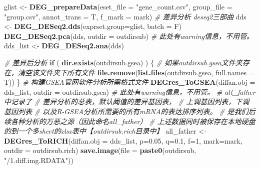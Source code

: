 \documentclass[
]{book}
\newenvironment{Shaded}{\begin{snugshade}}{\end{snugshade}}
\newcommand{\AttributeTok}[1]{\textcolor[rgb]{0.13,0.29,0.53}{#1}}
\newcommand{\CommentTok}[1]{\textcolor[rgb]{0.56,0.35,0.01}{\textit{#1}}}
\newcommand{\ControlFlowTok}[1]{\textcolor[rgb]{0.13,0.29,0.53}{\textbf{#1}}}
\newcommand{\DecValTok}[1]{\textcolor[rgb]{0.00,0.00,0.81}{#1}}
\newcommand{\FloatTok}[1]{\textcolor[rgb]{0.00,0.00,0.81}{#1}}
\newcommand{\FunctionTok}[1]{\textcolor[rgb]{0.13,0.29,0.53}{\textbf{#1}}}
\newcommand{\NormalTok}[1]{#1}
\newcommand{\OtherTok}[1]{\textcolor[rgb]{0.56,0.35,0.01}{#1}}
\newcommand{\StringTok}[1]{\textcolor[rgb]{0.31,0.60,0.02}{#1}}
\begin{document}
\begin{Shaded}
\begin{Highlighting}[]
\NormalTok{glist }\OtherTok{\textless{}{-}} \FunctionTok{DEG\_prepareData}\NormalTok{(}\AttributeTok{eset\_file =} \StringTok{"gene\_count.csv"}\NormalTok{,}
                         \AttributeTok{group\_file =} \StringTok{"group.csv"}\NormalTok{,}
                         \AttributeTok{annot\_trans =}\NormalTok{ T,}
                         \AttributeTok{f\_mark =}\NormalTok{ mark)}
\CommentTok{\# 差异分析 deseq2三部曲}
\NormalTok{dds }\OtherTok{\textless{}{-}} \FunctionTok{DEG\_DESeq2.dds}\NormalTok{(}\AttributeTok{exprset.group=}\NormalTok{glist, }\AttributeTok{batch =}\NormalTok{ F)}
\FunctionTok{DEG\_DESeq2.pca}\NormalTok{(dds, }\AttributeTok{outdir =}\NormalTok{ outdirsub) }\CommentTok{\# 此处有warning信息，不用管。}
\NormalTok{dds\_list }\OtherTok{\textless{}{-}} \FunctionTok{DEG\_DESeq2.ana}\NormalTok{(dds)}

\CommentTok{\# 差异后分析}
\ControlFlowTok{if}\NormalTok{ ( }\FunctionTok{dir.exists}\NormalTok{(outdirsub.gsea) ) \{}
  \CommentTok{\# 如果outdirsub.gsea文件夹存在，清空该文件夹下所有文件}
  \FunctionTok{file.remove}\NormalTok{(}\FunctionTok{list.files}\NormalTok{(outdirsub.gsea, }\AttributeTok{full.names =}\NormalTok{ T))}
\NormalTok{\}}
\CommentTok{\# 构建GSEA官网软件分析所需格式文件}
\FunctionTok{DEGres\_ToGSEA}\NormalTok{(}\AttributeTok{diffan.obj =}\NormalTok{ dds\_list, }\AttributeTok{outdir =}\NormalTok{ outdirsub.gsea) }\CommentTok{\# 此处有warning信息，不用管。}
\CommentTok{\# all\_father中记录了}
\CommentTok{\#             差异分析的总表，默认阈值的差异基因表，}
\CommentTok{\#             上调基因列表，下调基因列表}
\CommentTok{\#             以及R{-}GSEA分析所需要的所有mRNA的表达排序列表。}
\CommentTok{\#   是我们后续各种分析的万恶之源（因此命名all\_father）}
\CommentTok{\#   上述数据同时被保存在本地硬盘的到一个多sheet的xlsx表中【outdirsub.rich目录中】}
\NormalTok{all\_father }\OtherTok{\textless{}{-}} \FunctionTok{DEGres\_ToRICH}\NormalTok{(}\AttributeTok{diffan.obj =}\NormalTok{ dds\_list, }\AttributeTok{p=}\FloatTok{0.05}\NormalTok{, }\AttributeTok{q=}\FloatTok{0.1}\NormalTok{, }\AttributeTok{f=}\DecValTok{1}\NormalTok{,}
                            \AttributeTok{mark=}\NormalTok{mark, }\AttributeTok{outdir =}\NormalTok{ outdirsub.rich)}
\FunctionTok{save.image}\NormalTok{(}\AttributeTok{file =} \FunctionTok{paste0}\NormalTok{(outdirsub, }\StringTok{"/1.diff.img.RDATA"}\NormalTok{))}
\end{Highlighting}
\end{Shaded}
\end{document}
